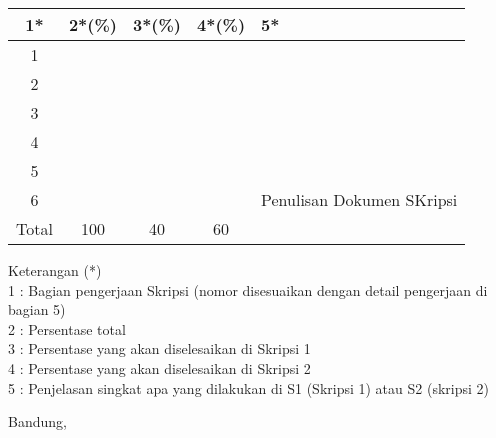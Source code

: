 \documentclass[a4paper,twoside]{article}
\begin{document}
\begin{center}
  \begin{tabular}{ | c | c | c | c | l |}
    \hline
    1*  & 2*(\%) & 3*(\%) & 4*(\%) &5*\\ \hline \hline
    1   &   &   &  &  \\ \hline
    2   &   &   &  &  \\ \hline
    3   &   &   &  & {\footnotesize }  \\ \hline
    4   &   &   &  & {\footnotesize } \\ \hline
    5   &   &   &  & {\footnotesize } \\ \hline
    6   &  &    &  & {\footnotesize Penulisan Dokumen SKripsi }\\ \hline
    
    Total  & 100  & 40  & 60 &  \\ \hline
                          \end{tabular}
\end{center}

Keterangan (*)\\
1 : Bagian pengerjaan Skripsi (nomor disesuaikan dengan detail pengerjaan di bagian 5)\\
2 : Persentase total \\
3 : Persentase yang akan diselesaikan di Skripsi 1 \\
4 : Persentase yang akan diselesaikan di Skripsi 2 \\
5 : Penjelasan singkat apa yang dilakukan di S1 (Skripsi 1) atau S2 (skripsi 2)

\vspace{1cm}
\centering Bandung, \tanggal\\
\vspace{2cm} \nama \\ 
\vspace{1cm}
\end{document}
